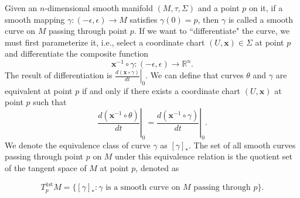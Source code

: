 \documentclass{report}
\begin{document}
Given an $n$-dimensional smooth manifold $(M,\tau,\Sigma)$ and a point $p$ on it, if a smooth mapping $\gamma:(-\epsilon,\epsilon)\to M$ satisfies $\gamma(0)=p$, then $\gamma$ is called a smooth curve on $M$ passing through point $p$. If we want to ``differentiate" the curve, we must first parameterize it, i.e., select a coordinate chart $(U,\mathbf{x})\in\Sigma$ at point $p$ and differentiate the composite function
\[
    \mathbf{x}^{-1} \circ \gamma:(-\epsilon,\epsilon)\to \mathbb{R}^n.
\]
The result of differentiation is $\left.\frac{d(\mathbf{x} \circ \gamma)}{dt}\right|_0$. 
We can define that curves $\theta$ and $\gamma$ are equivalent at point $p$ if and only if there exists a coordinate chart $(U,\mathbf{x})$ at point $p$ such that
\[
    \left.\frac{d(\mathbf{x}^{-1} \circ \theta)}{dt}\right|_0=\left.\frac{d(\mathbf{x}^{-1} \circ \gamma)}{dt}\right|_0.
\]
We denote the equivalence class of curve $\gamma$ as $[\gamma]_*$. The set of all smooth curves passing through point $p$ on $M$ under this equivalence relation is the quotient set of the tangent space of $M$ at point $p$, denoted as

\[
    T_p^{1\mathrm{st}}M = \{[\gamma]_*: \gamma \text{ is a smooth curve on } M \text{ passing through } p\}.
\]
\end{document}
